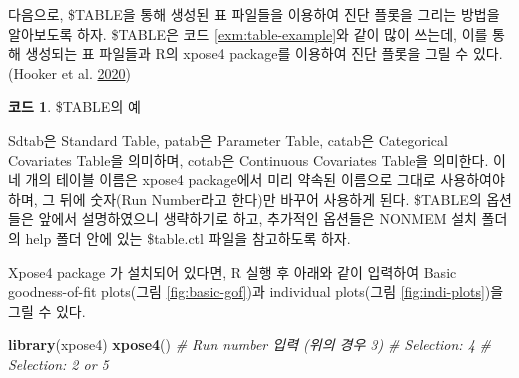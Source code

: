 \documentclass[
  10pt,
  krantz2,
  a4paper]{krantz}
\newenvironment{Shaded}{\begin{snugshade}}{\end{snugshade}}
\newcommand{\CommentTok}[1]{\textcolor[rgb]{0.56,0.35,0.01}{\textit{#1}}}
\newcommand{\DecValTok}[1]{\textcolor[rgb]{0.00,0.00,0.81}{#1}}
\newcommand{\KeywordTok}[1]{\textcolor[rgb]{0.13,0.29,0.53}{\textbf{#1}}}
\newcommand{\NormalTok}[1]{#1}
\newcommand{\OperatorTok}[1]{\textcolor[rgb]{0.81,0.36,0.00}{\textbf{#1}}}
\theoremstyle{definition}
\theoremstyle{definition}
\newtheorem{example}{코드}[chapter]
\theoremstyle{definition}
\theoremstyle{remark}
\begin{document}
다음으로, \$TABLE을 통해 생성된 표 파일들을 이용하여 진단 플롯을 그리는 방법을 알아보도록 하자. \$TABLE은 코드 \ref{exm:table-example}와 같이 많이 쓰는데, 이를 통해 생성되는 표 파일들과 R의 xpose4 package를 이용하여 진단 플롯을 그릴 수 있다. (Hooker et al. \protect\hyperlink{ref-R-xpose4}{2020})


\begin{example}
\protect\hypertarget{exm:table-example}{}{\label{exm:table-example} }\$TABLE의 예
\end{example}

\begin{Shaded}
\end{Shaded}

Sdtab은 Standard Table, patab은 Parameter Table, catab은 Categorical Covariates Table을 의미하며, cotab은 Continuous Covariates Table을 의미한다. 이 네 개의 테이블 이름은 xpose4 package에서 미리 약속된 이름으로 그대로 사용하여야 하며, 그 뒤에 숫자(Run Number라고 한다)만 바꾸어 사용하게 된다. \$TABLE의 옵션들은 앞에서 설명하였으니 생략하기로 하고, 추가적인 옵션들은 NONMEM 설치 폴더의 help 폴더 안에 있는 \$table.ctl 파일을 참고하도록 하자.

Xpose4 package 가 설치되어 있다면, R 실행 후 아래와 같이 입력하여 Basic goodness-of-fit plots(그림 \ref{fig:basic-gof})과 individual plots(그림 \ref{fig:indi-plots})을 그릴 수 있다.

\begin{Shaded}
\begin{Highlighting}[]
\KeywordTok{library}\NormalTok{(xpose4)}
\KeywordTok{xpose4}\NormalTok{()}
\CommentTok{\# Run number 입력 (위의 경우 3)}
\CommentTok{\# Selection: 4}
\CommentTok{\# Selection: 2 or 5}
\end{Highlighting}
\end{Shaded}
\end{document}
